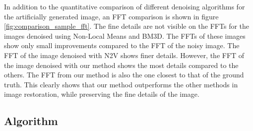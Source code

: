 \documentclass[fleqn,10pt]{wlscirep}
\begin{document}
	In addition to the quantitative comparison of different denoising algorithms for the artificially generated image, an FFT comparison is shown in figure \ref{fig:comparison_sample_fft}. The fine details are not visible on the FFTs for the images denoised using Non-Local Means and BM3D. The FFTs of these images show only small improvements compared to the FFT of the noisy image. The FFT of the image denoised with N2V shows finer details. However, the FFT of the image denoised with our method shows the most details compared to the others. The FFT from our method is also the one closest to that of the ground truth. This clearly shows that our method outperforms the other methods in image restoration, while preserving the fine details of the image. 
	
	\subsection*{Algorithm}
	\label{algorithms}
	
\end{document}
